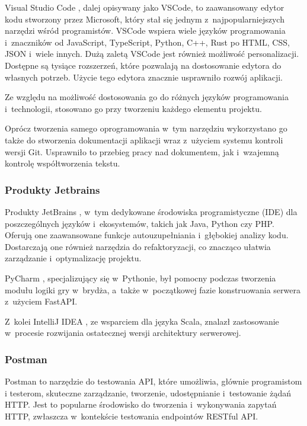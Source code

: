 Visual Studio Code \cite{VSCode}, dalej opisywany jako VSCode,
to zaawansowany edytor kodu stworzony
przez Microsoft, który stał się jednym z~najpopularniejszych narzędzi
wśród programistów\cite{IDEIndex}.
VSCode wspiera wiele języków programowania i~znaczników od JavaScript,
TypeScript, Python, C++, Rust po HTML, CSS, JSON i~wiele innych.
Dużą zaletą VSCode jest również możliwość personalizacji. Dostępne są
tysiące rozszerzeń, które pozwalają na dostosowanie edytora do własnych
potrzeb. Użycie tego edytora znacznie usprawniło rozwój aplikacji.

Ze względu na możliwość dostosowania go do różnych języków programowania
i~technologii, stosowano go przy tworzeniu każdego elementu projektu.

Oprócz tworzenia samego oprogramowania w~tym narzędziu wykorzystano go także
do stworzenia dokumentacji aplikacji wraz z~użyciem systemu kontroli wersji Git.
Usprawniło to przebieg pracy nad dokumentem, jak i~wzajemną kontrolę
współtworzenia tekstu.


\subsubsection{Produkty Jetbrains}

Produkty JetBrains \cite{JetBrains}, w~tym dedykowane środowiska
programistyczne (IDE) dla poszczególnych języków i~ekosystemów,
takich jak Java, Python czy PHP.
Oferują one zaawansowane funkcje autouzupełniania i~głębokiej
analizy kodu. Dostarczają one również narzędzia do refaktoryzacji,
co znacząco ułatwia zarządzanie i~optymalizację projektu.

PyCharm \cite{PyCharm}, specjalizujący się w~Pythonie, był pomocny podczas tworzenia
modułu logiki gry w~brydża, a~także w~początkowej fazie konstruowania
serwera z~użyciem FastAPI.

Z~kolei IntelliJ IDEA \cite{Intellij}, ze wsparciem dla języka
Scala, znalazł zastosowanie w~procesie rozwijania ostatecznej wersji
architektury serwerowej.


\subsubsection{Postman}

Postman \cite{Postman} to narzędzie do testowania API, które umożliwia, głównie
programistom i testerom, skuteczne zarządzanie, tworzenie, udostępnianie
i~testowanie żądań HTTP. Jest to popularne środowisko do tworzenia
i~wykonywania zapytań HTTP, zwłaszcza w~kontekście testowania
endpointów RESTful API.

